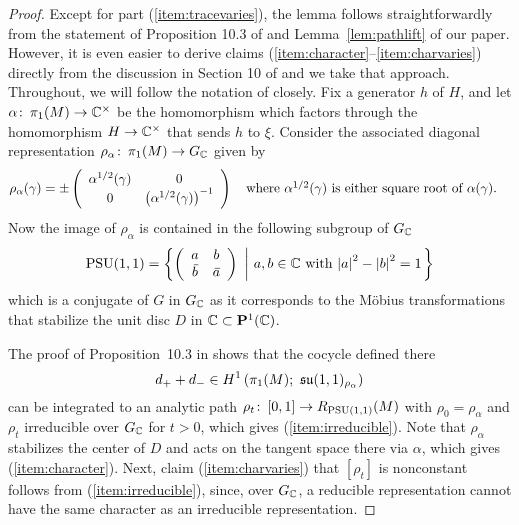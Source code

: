 \documentclass[tikz, sepfignums, defaultenums]{nmd/article}
\newcommand{\G}{G}
\newcommand{\GC}{G_\C}
\newcommand{\projsp}{\P}
\begin{document}
\begin{proof}
Except for part (\ref{item:tracevaries}), the lemma follows
straightforwardly from the statement of Proposition 10.3 of
\cite{HeusenerPorti2005} and Lemma~\ref{lem:pathlift} of our paper.
However, it is even easier to derive claims
(\ref{item:character}--\ref{item:charvaries}) directly from the
discussion in Section 10 of \cite{HeusenerPorti2005} and we take that
approach.  Throughout, we will follow the notation of
\cite{HeusenerPorti2005} closely.  Fix a generator $h$ of $H$, and let
$\alpha \colon\thinspace \pi_1(M) \to {\mathbb C}^\times$ be the homomorphism 
which factors through the homomorphism $H \to {\mathbb C}^\times$ that sends $h$ to $\xi$.
Consider the associated diagonal
representation $\rho_\alpha \maps \pi_1(M) \to \GC$ given by
\[
\rho_\alpha(\gamma) = 
    \pm
    \left(\begin{array}{cc} \alpha^{1/2}(\gamma) & 0 \\ 0 & \left(\alpha^{1/2}(\gamma)\right)^{-1} \end{array}\right)
    \quad \mbox{where $\alpha^{1/2}(\gamma)$ is either square root of $\alpha(\gamma)$.} \quad
\]
Now the image of $\rho_\alpha$ is contained in the following subgroup
of $\GC$
\[
\PSU(1,1) = \setdef{\twobytwomatrix{a}{b}{\bbar}{\abar}}{\mbox{$a, b \in \C$
  with $\abs{a}^2 - \abs{b}^2 = 1$}}
\]
which is a conjugate of $\G$ in $\GC$ as it corresponds to the
M\"obius transformations that stabilize the unit disc $D$ in
$\C \subset \projsp^1(\C)$.  

The proof of Proposition~10.3 in \cite{HeusenerPorti2005} shows that
the cocycle defined there
\[
d_+ + d_- \in H^1\left(\pi_1(M); \  \mathfrak{su}(1,1)_{\rho_\alpha}\right)
\]
can be integrated to an analytic path
$\rho_t \colon\thinspace [0, 1] \to R_{\mathrm{PSU}(1,1)}(M)$ with $\rho_0 = \rho_\alpha$
and $\rho_t$ irreducible over $\GC$ for $t > 0$, which gives
(\ref{item:irreducible}).  Note that $\rho_\alpha$ stabilizes the
center of $D$ and acts on the tangent space there via $\alpha$, which
gives (\ref{item:character}).  Next, claim (\ref{item:charvaries})
that $[\rho_t]$ is nonconstant follows from (\ref{item:irreducible}),
since, over $\GC$, a reducible representation cannot have the same
character as an irreducible representation.


\end{proof}
\end{document}
